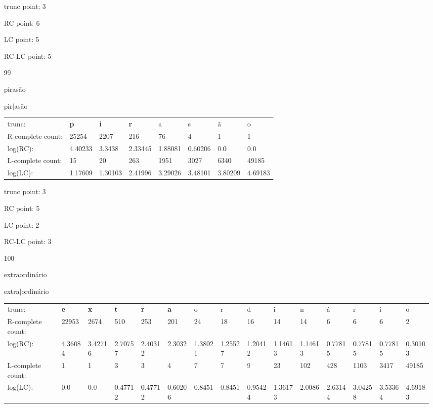 \documentclass{article}
\begin{document}
trunc point: 3

RC point: 6

LC point: 5

RC-LC point: 5

\vspace{3em}



99

pirasão

pir$|$asão

\vspace{1em}

\begin{tabular}{l|lllllll}

trunc: & {\color{red}\bf p} & {\color{red}\bf i} & {\color{red}\bf r} & a & s & ã & o \\ 
R-complete count: & 25254 & 2207 & 216 & 76 & 4 & 1 & 1 \\ 
log(RC): & 4.40233 & 3.3438 & 2.33445 & 1.88081 & 0.60206 & 0.0 & 0.0 \\ 
L-complete count: & 15 & 20 & 263 & 1951 & 3027 & 6340 & 49185 \\ 
log(LC): & 1.17609 & 1.30103 & 2.41996 & 3.29026 & 3.48101 & 3.80209 & 4.69183 \\ 
\end{tabular}

trunc point: 3

RC point: 5

LC point: 2

RC-LC point: 3

\vspace{3em}



100

extraordinário

extra$|$ordinário

\vspace{1em}

\begin{tabular}{l|llllllllllllll}

trunc: & {\color{red}\bf e} & {\color{red}\bf x} & {\color{red}\bf t} & {\color{red}\bf r} & {\color{red}\bf a} & o & r & d & i & n & á & r & i & o \\ 
R-complete count: & 22953 & 2674 & 510 & 253 & 201 & 24 & 18 & 16 & 14 & 14 & 6 & 6 & 6 & 2 \\ 
log(RC): & 4.36084 & 3.42716 & 2.70757 & 2.40312 & 2.3032 & 1.38021 & 1.25527 & 1.20412 & 1.14613 & 1.14613 & 0.77815 & 0.77815 & 0.77815 & 0.30103 \\ 
L-complete count: & 1 & 1 & 3 & 3 & 4 & 7 & 7 & 9 & 23 & 102 & 428 & 1103 & 3417 & 49185 \\ 
log(LC): & 0.0 & 0.0 & 0.47712 & 0.47712 & 0.60206 & 0.8451 & 0.8451 & 0.95424 & 1.36173 & 2.0086 & 2.63144 & 3.04258 & 3.53364 & 4.69183 \\ 
\end{tabular}
\end{document}
